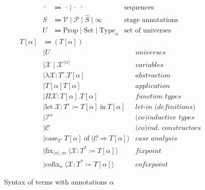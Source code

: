 \begin{figure}
\centering
\begin{align*}
\overline{\,\cdot\,} &\Coloneqq \,\cdot\, | \,\cdot\, \overline{\,\cdot\,} &\text{sequences} \\
S &\Coloneqq \mathcal{V} \mid \mathcal{P} \mid \widehat{S} \mid \infty &\text{stage annotations} \\
U &\Coloneqq \text{Prop} \mid \text{Set} \mid \text{Type}_n &\text{set of universes}
\end{align*}
\begin{align*}
T[\alpha] &\Coloneqq (T[\alpha]) \\
    &\mid U
        &\textit{universes}\\
    &\mid \mathcal{X} \mid \mathcal{X}^{\langle \alpha \rangle}
        &\textit{variables} \\
    &\mid \lambda \mathcal{X}: T^\circ. T[\alpha]
        &\textit{abstraction} \\
    &\mid T[\alpha] T[\alpha]
        &\textit{application} \\
    &\mid \Pi \mathcal{X}: T[\alpha]. T[\alpha]
        &\textit{function types} \\
    &\mid \text{let}\ \mathcal{X} : T^\circ \coloneqq T[\alpha] \ \text{in}\ T[\alpha]
        &\textit{let-in (definitions)} \\
    &\mid \mathcal{I}^\alpha
        &\textit{(co)inductive types} \\
    &\mid \mathcal{C}
        &\textit{(co)ind. constructors} \\
    &\mid \text{case}_{T^\circ} \ T[\alpha] \ \text{of} \ \langle \mathcal{C} \Rightarrow T[\alpha] \rangle
        &\textit{case analysis} \\
    &\mid \text{fix}_{\langle n \rangle, m} \ \langle \mathcal{X}: T^* \coloneqq T[\alpha] \rangle
        &\textit{fixpoint} \\
    &\mid \text{cofix}_{n} \ \langle \mathcal{X}: T^* \coloneqq T[\alpha] \rangle
        &\textit{cofixpoint}
\end{align*}
\caption{Syntax of \lang terms with annotations $\alpha$}
\label{fig:terms-general}
\end{figure}
